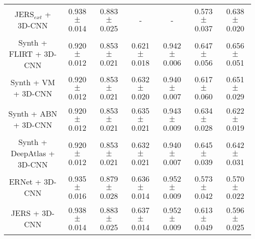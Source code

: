 \begin{table*}[t]
{\begin{tabular}{ccccccc}
    \\
    
    
    JERS$_{ext}$ + 
    3D-CNN & 
    0.938 $\pm$ 0.014 &
    0.883 $\pm$ 0.025 &
    - &
    - &
    0.573 $\pm$ 0.037 &
    0.638 $\pm$ 0.020

    \\

    
    Synth + 
    FLIRT +  
    3D-CNN &
    0.920 $\pm$ 0.012 &
    0.853 $\pm$ 0.021 &
    0.621 $\pm$ 0.018 &
    0.942 $\pm$ 0.006 &
    0.647 $\pm$ 0.056 &
    0.656 $\pm$ 0.051 
 
    \\

    
    Synth + 
    VM + 
    3D-CNN &
    0.920 $\pm$ 0.012 &
    0.853 $\pm$ 0.021 &
    0.632 $\pm$ 0.020 &
    0.940 $\pm$ 0.007 &
    0.617 $\pm$ 0.060 &
    0.651 $\pm$ 0.029 

    \\

    
    Synth + 
    ABN + 
    3D-CNN &
    0.920 $\pm$ 0.012 &
    0.853 $\pm$ 0.021 &
    0.635 $\pm$ 0.021 &
    0.943 $\pm$ 0.009 &
    0.634 $\pm$ 0.028 &
    0.622 $\pm$ 0.019 

    \\

    
    Synth + 
    DeepAtlas + 
    3D-CNN &
    0.920 $\pm$ 0.012 &
    0.853 $\pm$ 0.021 &
    0.632 $\pm$ 0.021 &
    0.940 $\pm$ 0.007 &
    0.645 $\pm$ 0.039 &
    0.642 $\pm$ 0.031 
    
    \\

    
    ERNet + 
    3D-CNN & 
    0.935 $\pm$ 0.016 &
    0.879 $\pm$ 0.028 &
    0.636 $\pm$ 0.014 &
    0.952 $\pm$ 0.009 &
    0.573 $\pm$ 0.042 &
    0.570 $\pm$ 0.022 

    \\

    
    JERS +
    3D-CNN & 
    0.938 $\pm$ 0.014 &
    0.883 $\pm$ 0.025 &
    0.637 $\pm$ 0.014 &
    0.952 $\pm$ 0.009 &
    0.613 $\pm$ 0.049 &
    0.596 $\pm$ 0.025 



\end{tabular}}
\end{table*}
